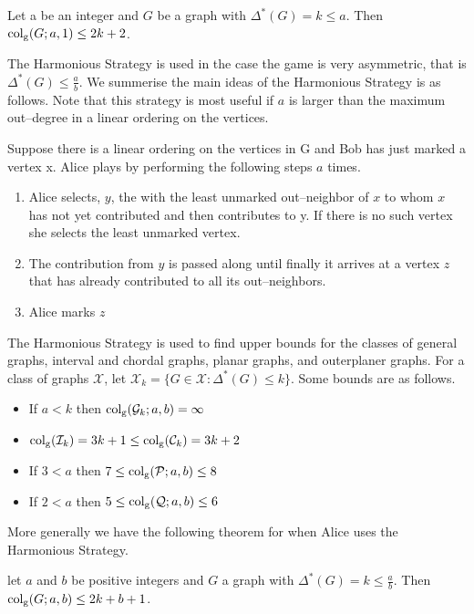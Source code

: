 \begin{theorem}\label{thm:kiYa2005}
    Let a be an integer and $G$ be a graph with $\Delta^*(G) = k\leq a$. Then
    $\operatorname{col_g}(G;a,1) \leq 2k + 2$.
\end{theorem}

The Harmonious Strategy is used in the case the game is very asymmetric, that is $\Delta^*(G)\leq \frac{a}{b}$. We summerise the main ideas of the Harmonious Strategy is as follows. Note that this strategy is most useful if $a$ is larger than the maximum out--degree in a linear ordering on the vertices.

Suppose there is a linear ordering on the vertices in G and Bob has just marked a vertex x. Alice plays by performing the following steps $a$ times.    
\begin{enumerate}
    \item  Alice selects, $y$, the with the least unmarked out--neighbor of $x$ to whom $x$ has not yet contributed and then contributes to y. If there is no such vertex she selects the least unmarked vertex.
    \item  The contribution from $y$
    is passed along until finally it arrives at a vertex $z$ that has already contributed to all its out--neighbors.
    \item  Alice marks $z$
\end{enumerate}

The Harmonious Strategy is used to find upper bounds for the classes of general graphs, interval and chordal graphs, planar graphs, and outerplaner graphs. For a class of graphs $\mathcal{X}$, let $\mathcal{X}_k= \{G\in\mathcal{X}: \Delta^*(G)\leq k\}$. Some bounds are as follows.    
\begin{itemize}
    \item If $a < k$ then $\operatorname{col_g}(\mathcal{G}_k;a,b)=\infty$
    \item $\operatorname{col_g}(\mathcal{I}_k)=3k+1\leq\operatorname{col_g}(\mathcal{C}_k)=3k+2$
    \item If $3<a $ then $7\leq \operatorname{col_g}(\mathcal{P};a,b)\leq 8$
    \item If $2< a$ then $5\leq \operatorname{col_g}(\mathcal{Q};a,b)\leq 6$
\end{itemize}
More generally we have the following theorem for when Alice uses the Harmonious Strategy.
\begin{theorem}
    let $a$ and $b$ be positive integers and $G$ a graph with $\Delta^*(G)=k\leq\frac{a}{b}$. Then $\operatorname{col_g}(G;a,b)\leq 2k+b+1$.
\end{theorem}

